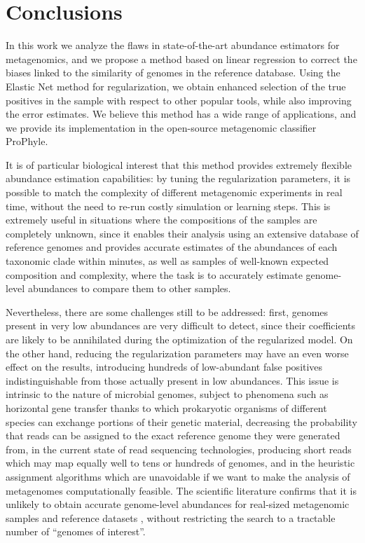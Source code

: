 
\chapter{Conclusions}
\label{Chapter5}

In this work we analyze the flaws in state-of-the-art abundance estimators for metagenomics, and we propose a method based on linear regression to correct the biases linked to the similarity of genomes in the reference database. Using the Elastic Net method for regularization, we obtain enhanced selection of the true positives in the sample with respect to other popular tools, while also improving the error estimates. We believe this method has a wide range of applications, and we provide its implementation in the open-source metagenomic classifier ProPhyle.

It is of particular biological interest that this method provides extremely flexible abundance estimation capabilities: by tuning the regularization parameters, it is possible to match the complexity of different metagenomic experiments in real time, without the need to re-run costly simulation or learning steps. This is extremely useful in situations where the compositions of the samples are completely unknown, since it enables their analysis using an extensive database of reference genomes and provides accurate estimates of the abundances of each taxonomic clade within minutes, as well as samples of well-known expected composition and complexity, where the task is to accurately estimate genome-level abundances to compare them to other samples.

Nevertheless, there are some challenges still to be addressed: first, genomes present in very low abundances are very difficult to detect, since their coefficients are likely to be annihilated during the optimization of the regularized model. On the other hand, reducing the regularization parameters may have an even worse effect on the results, introducing hundreds of low-abundant false positives indistinguishable from those actually present in low abundances. This issue is intrinsic to the nature of microbial genomes, subject to phenomena such as horizontal gene transfer thanks to which prokaryotic organisms of different species can exchange portions of their genetic material, decreasing the probability that reads can be assigned to the exact reference genome they were generated from, in the current state of read sequencing technologies, producing short reads which may map equally well to tens or hundreds of genomes, and in the heuristic assignment algorithms which are unavoidable if we want to make the analysis of metagenomes computationally feasible. The scientific literature confirms that it is unlikely to obtain accurate genome-level abundances for real-sized metagenomic samples and reference datasets \cite{lindgreen_evaluation_2016,nasko_refseq_2018,fischer_abundance_2017}, without restricting the search to a tractable number of ``genomes of interest''.

